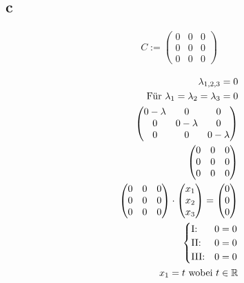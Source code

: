 \subsection{c}

\begin{align*}
    C := \begin{pmatrix}
        0 & 0 & 0 \\
        0 & 0 & 0 \\
        0 & 0 & 0
    \end{pmatrix}
\end{align*}

\begin{align*}
    \lambda_{1, 2, 3} = 0 \\ 
    \text{Für } \lambda_1 = \lambda_2 = \lambda_3 = 0 \\
    \begin{pmatrix}
        0 - \lambda & 0 & 0 \\
        0 & 0 - \lambda & 0 \\
        0 & 0 & 0 - \lambda
    \end{pmatrix} \\ 
    \begin{pmatrix}
        0 & 0 & 0 \\
        0 & 0 & 0 \\
        0 & 0 & 0
    \end{pmatrix} \\
    \begin{pmatrix}
        0 & 0 & 0 \\
        0 & 0 & 0 \\
        0 & 0 & 0
    \end{pmatrix} \cdot \begin{pmatrix}
        x_1 \\ x_2 \\ x_3
    \end{pmatrix} = \begin{pmatrix}
        0 \\ 0 \\ 0
    \end{pmatrix} \\
    \begin{cases}
        \text{I:\@} & 0 = 0 \\
        \text{II:\@} & 0 = 0 \\
        \text{III:\@} & 0 = 0
    \end{cases} \\
    x_1 = t \text{ wobei } t \in \mathbb{R} \\

\end{align*}
